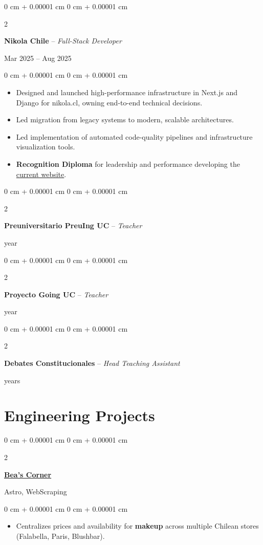 \documentclass[10pt, letterpaper]{article}
\newenvironment{highlights}{
    \begin{itemize}[
        topsep=0.10 cm,
        parsep=0.10 cm,
        partopsep=0pt,
        itemsep=0pt,
        leftmargin=0 cm + 10pt
    ]
}{
    \end{itemize}
} %
\newenvironment{onecolentry}{
    \begin{adjustwidth}{
        0 cm + 0.00001 cm
    }{
        0 cm + 0.00001 cm
    }
}{
    \end{adjustwidth}
} %
\newenvironment{twocolentry}[2][]{
    \onecolentry
    \def\secondColumn{#2}
    \setcolumnwidth{\fill, 4.5 cm}
    \begin{paracol}{2}
}{
    \switchcolumn \raggedleft \secondColumn
    \end{paracol}
    \endonecolentry
} %
\let\hrefWithoutArrow\href
\begin{document}
    \begin{twocolentry}{Mar 2025 -- Aug 2025}
        \textbf{Nikola Chile} -- \textit{Full-Stack Developer}
    \end{twocolentry}
    \vspace{0.10 cm}
    \begin{onecolentry}
        \begin{highlights}
            \item Designed and launched high-performance infrastructure in Next.js and Django for nikola.cl, owning end-to-end technical decisions.
            \item Led migration from legacy systems to modern, scalable architectures.
            \item Led implementation of automated code-quality pipelines and infrastructure visualization tools.
            \item \textbf{Recognition Diploma} for leadership and performance developing the \href{https://www.nikola.cl}{current website}.
        \end{highlights}
    \end{onecolentry}
    \vspace{0.2 cm}

    \begin{twocolentry}{1 year}
        \textbf{Preuniversitario PreuIng UC} -- \textit{Teacher}
    \end{twocolentry}
    \vspace{0.2 cm}

    \begin{twocolentry}{1 year}
        \textbf{Proyecto Going UC} -- \textit{Teacher}
    \end{twocolentry}
    \vspace{0.2 cm}

    \begin{twocolentry}{2 years}
        \textbf{Debates Constitucionales} -- \textit{Head Teaching Assistant}
    \end{twocolentry}

    \section{Engineering Projects}

    \begin{twocolentry}{Astro, WebScraping}
        \textbf{\hrefWithoutArrow{https://beascorner.onrender.com/}{Bea's Corner}}
    \end{twocolentry}
    \vspace{0.10 cm}
    \begin{onecolentry}
        \begin{highlights}
            \item Centralizes prices and availability for \textbf{makeup} across multiple Chilean stores (Falabella, Paris, Blushbar).
        \end{highlights}
    \end{onecolentry}
    \vspace{0.2 cm}
\end{document}
